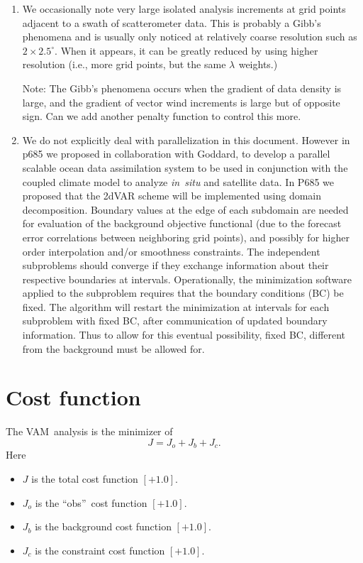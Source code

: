 \documentclass[11pt]{article}
\newcommand{\degrees}[1]{\mbox{$ {#1}^\circ $}}
\newcommand{\gl}[1]{\mbox{$ \lambda_{#1} $}}
\newcommand{\obs}{``obs''}
\newcommand{\vam}{VAM}
\newcommand{\xx}[1]{\section {#1}}
\newcommand{\eql}[2]{\begin{equation} \label{eq:#1} #2 \end{equation}}
\newcommand{\vardef}[3]{\item $ {#1} $ is the {#2} $ [{#3}] $. }
\begin{document}
\begin{enumerate}
(Note that going from \degrees{2 \times 2.5} to \degrees{1 \times 1}
with the same lambda weights makes a difference because of finite
difference errors.  However going from \degrees{1 \times 1} to
\degrees{0.5 \times 0.5} with the same lambda weights should make only
minor differences.)

\item We occasionally note very large isolated analysis increments at
grid points adjacent to a swath of scatterometer data.  This is
probably a Gibb's phenomena and is usually only noticed at relatively
coarse resolution such as \degrees{2 \times 2.5}.  When it appears, it
can be greatly reduced by using higher resolution (i.e., more grid
points, but the same \gl{} weights.)

Note: The Gibb's phenomena occurs when the gradient of data density is
large, and the gradient of vector wind increments is large but of
opposite sign.  Can we add another penalty function to control this
more.

 \item We do not explicitly deal with parallelization in this
document.  However in p685 we proposed in collaboration with Goddard,
to develop a parallel scalable ocean data assimilation system to be
used in conjunction with the coupled climate model to analyze {\em
in~situ} and satellite data.  In P685 we proposed that the 2dVAR
scheme will be implemented using domain decomposition.  Boundary
values at the edge of each subdomain are needed for evaluation of the
background objective functional (due to the forecast error
correlations between neighboring grid points), and possibly for higher
order interpolation and/or smoothness constraints.  The independent
subproblems should converge if they exchange information about their
respective boundaries at intervals.  Operationally, the minimization
software applied to the subproblem requires that the boundary
conditions (BC) be fixed.  The algorithm will restart the minimization
at intervals for each subproblem with fixed BC, after communication of
updated boundary information.  Thus to allow for this eventual
possibility, fixed BC, different from the background must be allowed
for.

 \end{enumerate}

\xx {Cost function}

The \vam\ analysis is the minimizer of
 \eql{J}{ J = J_o + J_b + J_c . }
 Here \begin{itemize}
  \vardef{J}{total cost function}{+1.0}
  \vardef{J_o}{\obs\ cost function}{+1.0}
  \vardef{J_b}{background cost function}{+1.0}
  \vardef{J_c}{constraint cost function}{+1.0}
 \end{itemize} 
\end{document}
